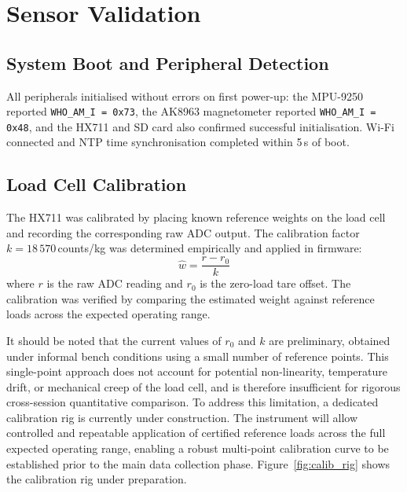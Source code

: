 \section{Sensor Validation}
\label{section:sensor_validation}

\subsection{System Boot and Peripheral Detection}

All peripherals initialised without errors on first power-up: the MPU-9250
reported \texttt{WHO\_AM\_I\,=\,0x73}, the AK8963 magnetometer reported
\texttt{WHO\_AM\_I\,=\,0x48}, and the HX711 and SD card also confirmed
successful initialisation.
Wi-Fi connected and NTP time synchronisation completed within 5\,s of boot.

\subsection{Load Cell Calibration}

The HX711 was calibrated by placing known reference weights on the load cell
and recording the corresponding raw ADC output.
The calibration factor $k = 18\,570$\,counts/kg was determined empirically
and applied in firmware:
\begin{equation}
  \hat{w} = \frac{r - r_0}{k}
  \label{eq:hx711_calib}
\end{equation}
where $r$ is the raw ADC reading and $r_0$ is the zero-load tare offset.
The calibration was verified by comparing the estimated weight against
reference loads across the expected operating range.

It should be noted that the current values of $r_0$ and $k$ are preliminary,
obtained under informal bench conditions using a small number of reference
points.
This single-point approach does not account for potential non-linearity,
temperature drift, or mechanical creep of the load cell, and is therefore
insufficient for rigorous cross-session quantitative comparison.
To address this limitation, a dedicated calibration rig is currently under
construction. The instrument will allow controlled and repeatable application
of certified reference loads across the full expected operating range,
enabling a robust multi-point calibration curve to be established prior to
the main data collection phase.
Figure~\ref{fig:calib_rig} shows the calibration rig under preparation.


